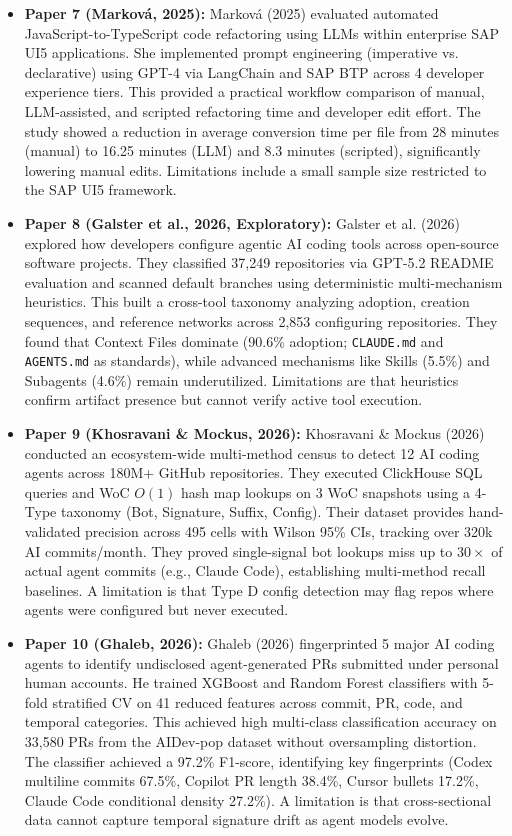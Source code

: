 \documentclass[11pt,a4paper]{article}
\begin{document}
\begin{itemize}[leftmargin=1.5em, itemsep=8pt]
    \item \textbf{Paper 7 (Markov\'{a}, 2025):}
    Markov\'{a} (2025) evaluated automated JavaScript-to-TypeScript code refactoring using LLMs within enterprise SAP UI5 applications. She implemented prompt engineering (imperative vs. declarative) using GPT-4 via LangChain and SAP BTP across 4 developer experience tiers. This provided a practical workflow comparison of manual, LLM-assisted, and scripted refactoring time and developer edit effort. The study showed a reduction in average conversion time per file from 28 minutes (manual) to 16.25 minutes (LLM) and 8.3 minutes (scripted), significantly lowering manual edits. Limitations include a small sample size restricted to the SAP UI5 framework.

    \item \textbf{Paper 8 (Galster et al., 2026, Exploratory):}
    Galster et al. (2026) explored how developers configure agentic AI coding tools across open-source software projects. They classified 37,249 repositories via GPT-5.2 README evaluation and scanned default branches using deterministic multi-mechanism heuristics. This built a cross-tool taxonomy analyzing adoption, creation sequences, and reference networks across 2,853 configuring repositories. They found that Context Files dominate (90.6\% adoption; \texttt{CLAUDE.md} and \texttt{AGENTS.md} as standards), while advanced mechanisms like Skills (5.5\%) and Subagents (4.6\%) remain underutilized. Limitations are that heuristics confirm artifact presence but cannot verify active tool execution.

    \item \textbf{Paper 9 (Khosravani \& Mockus, 2026):}
    Khosravani \& Mockus (2026) conducted an ecosystem-wide multi-method census to detect 12 AI coding agents across 180M+ GitHub repositories. They executed ClickHouse SQL queries and WoC $O(1)$ hash map lookups on 3 WoC snapshots using a 4-Type taxonomy (Bot, Signature, Suffix, Config). Their dataset provides hand-validated precision across 495 cells with Wilson 95\% CIs, tracking over 320k AI commits/month. They proved single-signal bot lookups miss up to $30\times$ of actual agent commits (e.g., Claude Code), establishing multi-method recall baselines. A limitation is that Type D config detection may flag repos where agents were configured but never executed.

    \item \textbf{Paper 10 (Ghaleb, 2026):}
    Ghaleb (2026) fingerprinted 5 major AI coding agents to identify undisclosed agent-generated PRs submitted under personal human accounts. He trained XGBoost and Random Forest classifiers with 5-fold stratified CV on 41 reduced features across commit, PR, code, and temporal categories. This achieved high multi-class classification accuracy on 33,580 PRs from the AIDev-pop dataset without oversampling distortion. The classifier achieved a 97.2\% F1-score, identifying key fingerprints (Codex multiline commits 67.5\%, Copilot PR length 38.4\%, Cursor bullets 17.2\%, Claude Code conditional density 27.2\%). A limitation is that cross-sectional data cannot capture temporal signature drift as agent models evolve.


\end{itemize}
\end{document}
